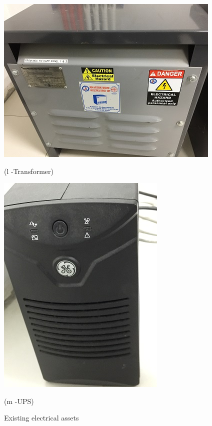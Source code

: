 \begin{figure}
\begin{minipage}[b]{0.22\linewidth}
	\includegraphics[width=\textwidth]{figures/R1P_visual/transformer}
	\caption*{(l -Transformer)}
\end{minipage}
	\hspace{0.03cm}
\begin{minipage}[b]{0.22\linewidth}
	\includegraphics[width=\textwidth]{figures/R1P_visual/UPS}
	\caption*{(m -UPS)}
\end{minipage}
	\caption{Existing electrical assets}
	\label{fig_ch04_elecaudit_visualinspection}
\end{figure}